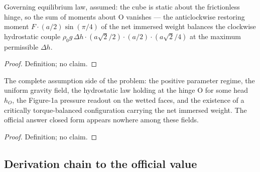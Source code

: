 \begin{definition}
\label{def:IPhO2026Problems_problem_IPhO_2026_1_A_1:IsCriticalTorqueBalance}
Governing equilibrium law, assumed: the cube is static about the frictionless
hinge, so the sum of moments about O vanishes — the anticlockwise restoring
moment $F \cdot (a/2)\sin(\pi/4)$ of the net immersed weight balances the
clockwise hydrostatic couple
$\rho_0 g\, \Delta h \cdot (a\sqrt{2}/2) \cdot (a/2) \cdot (a\sqrt{2}/4)$ at
the maximum permissible $\Delta h$.
\end{definition}
\begin{proof}
Definition; no claim.
\end{proof}

\begin{definition}
\label{def:IPhO2026Problems_problem_IPhO_2026_1_A_1:HydrostaticGateSetup}
The complete assumption side of the problem: the positive parameter regime,
the uniform gravity field, the hydrostatic law holding at the hinge O for
some head $h_O$, the Figure-1a pressure readout on the wetted faces, and the
existence of a critically torque-balanced configuration carrying the net
immersed weight. The official answer closed form appears nowhere among these
fields.
\end{definition}
\begin{proof}
Definition; no claim.
\end{proof}

\subsection*{Derivation chain to the official value}

